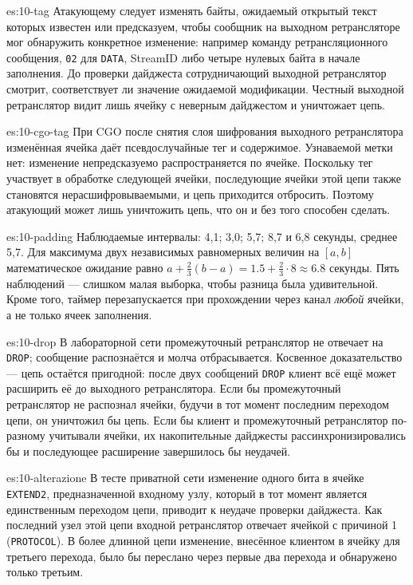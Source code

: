 \begin{soluzione}{es:10-tag}
Атакующему следует изменять байты, ожидаемый открытый текст которых известен или предсказуем, чтобы сообщник на выходном ретрансляторе мог обнаружить конкретное изменение: например команду ретрансляционного сообщения, \texttt{02} для \texttt{DATA}, StreamID либо четыре нулевых байта в начале заполнения. До проверки дайджеста сотрудничающий выходной ретранслятор смотрит, соответствует ли значение ожидаемой модификации. Честный выходной ретранслятор видит лишь ячейку с неверным дайджестом и уничтожает цепь.
\end{soluzione}

\begin{soluzione}{es:10-cgo-tag}
При CGO после снятия слоя шифрования выходного ретранслятора изменённая ячейка даёт псевдослучайные тег и содержимое. Узнаваемой метки нет: изменение непредсказуемо распространяется по ячейке. Поскольку тег участвует в обработке следующей ячейки, последующие ячейки этой цепи также становятся нерасшифровываемыми, и цепь приходится отбросить. Поэтому атакующий может лишь уничтожить цепь, что он и без того способен сделать.
\end{soluzione}

\begin{soluzione}{es:10-padding}
Наблюдаемые интервалы: 4,1; 3,0; 5,7; 8,7 и 6,8 секунды, среднее 5,7. Для максимума двух независимых равномерных величин на $[a, b]$ математическое ожидание равно $a + \tfrac{2}{3}(b - a) = 1.5 + \tfrac{2}{3} \cdot 8 \approx 6.8$ секунды. Пять наблюдений — слишком малая выборка, чтобы разница была удивительной. Кроме того, таймер перезапускается при прохождении через канал \emph{любой} ячейки, а не только ячеек заполнения.
\end{soluzione}

\begin{soluzione}{es:10-drop}
В лабораторной сети промежуточный ретранслятор не отвечает на \texttt{DROP}; сообщение распознаётся и молча отбрасывается. Косвенное доказательство — цепь остаётся пригодной: после двух сообщений \texttt{DROP} клиент всё ещё может расширить её до выходного ретранслятора. Если бы промежуточный ретранслятор не распознал ячейки, будучи в тот момент последним переходом цепи, он уничтожил бы цепь. Если бы клиент и промежуточный ретранслятор по-разному учитывали ячейки, их накопительные дайджесты рассинхронизировались бы и последующее расширение завершилось бы неудачей.
\end{soluzione}

\begin{soluzione}{es:10-alterazione}
В тесте приватной сети изменение одного бита в ячейке \texttt{EXTEND2}, предназначенной входному узлу, который в тот момент является единственным переходом цепи, приводит к неудаче проверки дайджеста. Как последний узел этой цепи входной ретранслятор отвечает ячейкой  с причиной 1 (\texttt{PROTOCOL}). В более длинной цепи изменение, внесённое клиентом в ячейку для третьего перехода, было бы переслано через первые два перехода и обнаружено только третьим.
\end{soluzione}

